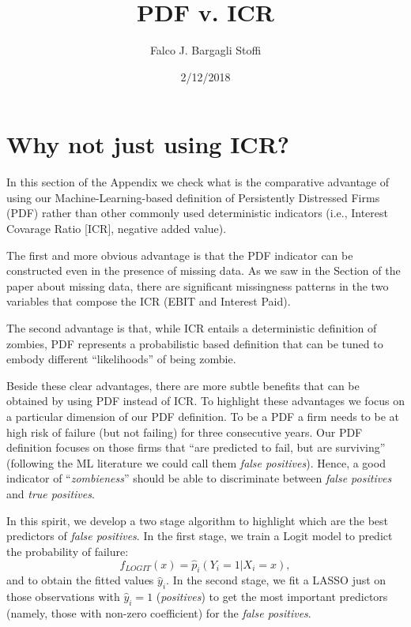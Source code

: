 \documentclass[]{article}
\title{PDF v. ICR}
\author{Falco J. Bargagli Stoffi}
\date{2/12/2018}
\begin{document}
\maketitle

\hypertarget{why-not-just-using-icr}{%
\section{Why not just using ICR?}\label{why-not-just-using-icr}}

In this section of the Appendix we check what is the comparative
advantage of using our Machine-Learning-based definition of Persistently
Distressed Firms (PDF) rather than other commonly used deterministic
indicators (i.e., Interest Covarage Ratio {[}ICR{]}, negative added
value).

\par

The first and more obvious advantage is that the PDF indicator can be
constructed even in the presence of missing data. As we saw in the
Section of the paper about missing data, there are significant
missingness patterns in the two variables that compose the ICR (EBIT and
Interest Paid).

\par

The second advantage is that, while ICR entails a deterministic
definition of zombies, PDF represents a probabilistic based definition
that can be tuned to embody different ``likelihoods'' of being zombie.

\par

Beside these clear advantages, there are more subtle benefits that can
be obtained by using PDF instead of ICR. To highlight these advantages
we focus on a particular dimension of our PDF definition. To be a PDF a
firm needs to be at high risk of failure (but not failing) for three
consecutive years. Our PDF definition focuses on those firms that ``are
predicted to fail, but are surviving'' (following the ML literature we
could call them \textit{false positives}). Hence, a good indicator of
``\textit{zombieness}'' should be able to discriminate between
\textit{false positives} and \textit{true positives}.

\par

In this spirit, we develop a two stage algorithm to highlight which are
the best predictors of \textit{false positives}. In the first stage, we
train a Logit model to predict the probability of failure:
\begin{equation}
 f_{LOGIT}(x) = \hat{p}_i(Y_i = 1 | X_i = x),
\end{equation} and to obtain the fitted values \(\hat{y}_i\). In the
second stage, we fit a LASSO just on those observations with
\(\hat{y}_i=1\) (\textit{positives}) to get the most important
predictors (namely, those with non-zero coefficient) for the
\textit{false positives}.
\end{document}
